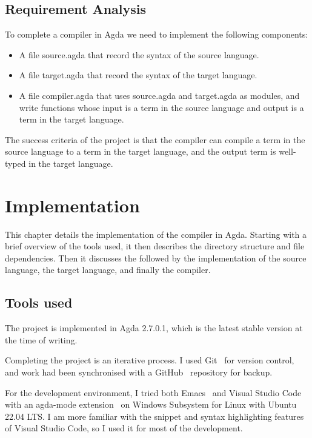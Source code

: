 \documentclass[12pt,twoside,a4paper]{report}
\theoremstyle{definition}
\theoremstyle{definition}
\theoremstyle{definition}
\theoremstyle{definition}
\begin{document}
    \section{Requirement Analysis}
    To complete a compiler in Agda we need to implement the following components:
    \begin{itemize}
        \item 
            A file source.agda that record the syntax of the source language.

        \item
            A file target.agda that record the syntax of the target language.

        \item
            A file compiler.agda that uses source.agda and target.agda as modules, and write functions whose input is a term in the source language and output is a term in the target language.
    \end{itemize}
    The success criteria of the project is that the compiler can compile a term in the source language to a term in the target language, and the output term is well-typed in the target language.

\chapter{Implementation} \label{chap: implementation}
    \minitoc
    This chapter details the implementation of the compiler in Agda. Starting with a brief overview of the tools used, it then describes the directory structure and file dependencies. Then it discusses the 
    followed by the implementation of the source language, the target language, and finally the compiler.
    

    \section{Tools used}
    The project is implemented in Agda 2.7.0.1, which is the latest stable version at the time of writing.

    Completing the project is an iterative process. I used Git~\cite{git} for version control, and work had been synchronised with a GitHub~\cite{github} repository for backup.

    For the development environment, I tried both Emacs~\cite{emacs} and Visual Studio Code~\cite{vscode} with an agda-mode extension~\cite{agda_mode} on Windows Subsystem for Linux with Ubuntu~\cite{wsl_ubuntu} 22.04 LTS. I am more familiar with the snippet and syntax highlighting features of Visual Studio Code, so I used it for most of the development. 
\end{document}
